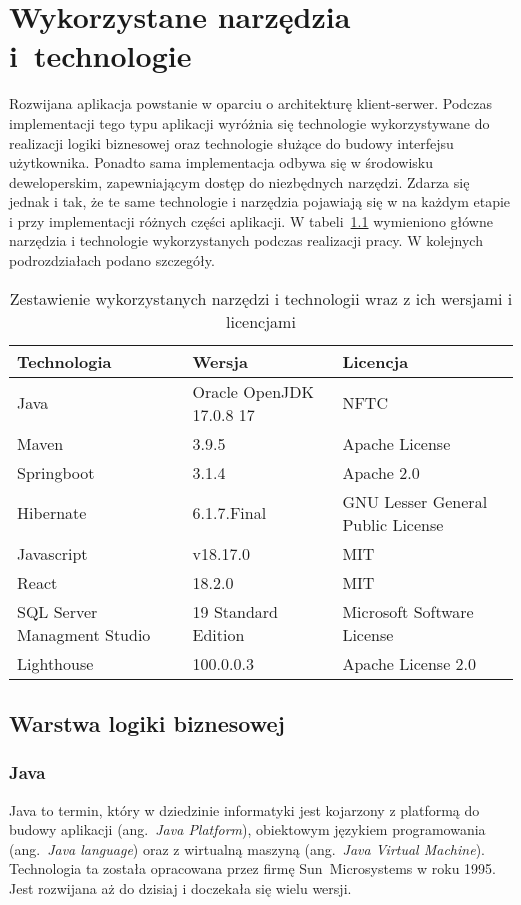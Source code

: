 \chapter{Wykorzystane narzędzia i~technologie}
Rozwijana aplikacja powstanie w oparciu o architekturę klient-serwer. Podczas implementacji tego typu aplikacji wyróżnia się technologie wykorzystywane do realizacji logiki biznesowej oraz technologie służące do budowy interfejsu użytkownika. Ponadto sama implementacja odbywa się w środowisku deweloperskim, zapewniającym dostęp do niezbędnych narzędzi. Zdarza się jednak i tak, że te same technologie i narzędzia pojawiają się w na każdym etapie i przy implementacji różnych części aplikacji.
W tabeli~\ref{tab:zestawienie_narzędzi} wymieniono główne narzędzia i technologie wykorzystanych podczas realizacji pracy.
W kolejnych podrozdziałach podano szczegóły.


\begin{table}[htb] \small
	\centering
\caption{Zestawienie wykorzystanych narzędzi i technologii wraz z ich wersjami i licencjami}
\label{tab:zestawienie_narzędzi}
\begin{tabularx}{\linewidth}{|l|l|X|}
    \hline
    Technologia & Wersja & Licencja \\
    \hline \hline
    Java & Oracle OpenJDK 17.0.8 17 &  NFTC\\
    \hline
    Maven & 3.9.5 & Apache License\\
    \hline
    Springboot & 3.1.4 & Apache 2.0\\
    \hline
    Hibernate & 6.1.7.Final & GNU Lesser General Public License \\
    \hline
		Javascript & v18.17.0 & MIT \\
    \hline
		React & 18.2.0 & MIT \\
    \hline
		SQL Server Managment Studio & 19 Standard Edition & Microsoft Software License\\
		 \hline
		Lighthouse & 100.0.0.3 & Apache License 2.0\\

    \hline
\end{tabularx}
\end{table}

\section{Warstwa logiki biznesowej}
\subsection{Java}
Java to termin, który w dziedzinie informatyki jest kojarzony z platformą do budowy aplikacji (ang.~\emph{Java Platform}), obiektowym językiem programowania (ang.~\emph{Java language}) oraz z wirtualną maszyną (ang.~\emph{Java Virtual Machine}). Technologia ta została opracowana przez firmę Sun~Microsystems w roku 1995. Jest rozwijana aż do dzisiaj i doczekała się wielu wersji. 

